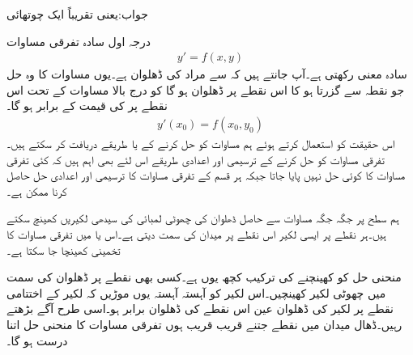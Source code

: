 جواب:یعنی تقریباً ایک چوتھائی

درجہ اول سادہ تفرقی مساوات
\begin{align}\label{مساوات_سادہ_اول_ڈھلوان_تفاعل_الف}
y'=f(x,y)
\end{align}
سادہ معنی رکھتی ہے۔آپ جانتے ہیں کہ  سے مراد  کی ڈھلوان ہے۔یوں مساوات  کا وہ حل جو نقطہ  سے گزرتا ہو کا اس نقطے پر ڈھلوان  ہو گا کو درج بالا مساوات کے تحت اس نقطے پر  کی قیمت کے برابر ہو گا۔
\begin{align*}
y'(x_0)=f(x_0,y_0)
\end{align*}
اس حقیقت کو استعمال کرتے ہوئے ہم مساوات  کو حل کرنے کے   یا  طریقے دریافت کر سکتے ہیں۔تفرقی مساوات کو حل کرنے کے ترسیمی اور اعدادی طریقے اس لئے بھی اہم ہیں کہ کئی تفرقی مساوات کا کوئی  حل نہیں پایا جاتا جبکہ ہر قسم کے تفرقی مساوات کا ترسیمی اور اعدادی حل حاصل کرنا ممکن ہے۔   

ہم  سطح پر جگہ جگہ مساوات  سے حاصل ڈھلوان کی چھوٹی لمبائی کی سیدھی لکیریں کھینچ سکتے ہیں۔ہر نقطے پر ایسی لکیر اس نقطے پر میدان کی سمت دیتی ہے۔اس  یا   میں تفرقی مساوات کا  تخمینی  کھینچا جا سکتا ہے۔

منحنی حل کو کھینچنے کی ترکیب کچھ یوں ہے۔کسی بھی نقطے پر ڈھلوان کی سمت میں چھوٹی لکیر کھینچیں۔اس لکیر کو آہستہ آہستہ یوں موڑیں کہ لکیر کے اختتامی نقطے پر لکیر کی ڈھلوان عین اس نقطے کی ڈھلوان برابر ہو۔اسی طرح آگے بڑھتے رہیں۔ڈھال میدان میں نقطے جتنے قریب قریب ہوں تفرقی مساوات کا منحنی حل اتنا درست ہو گا۔

